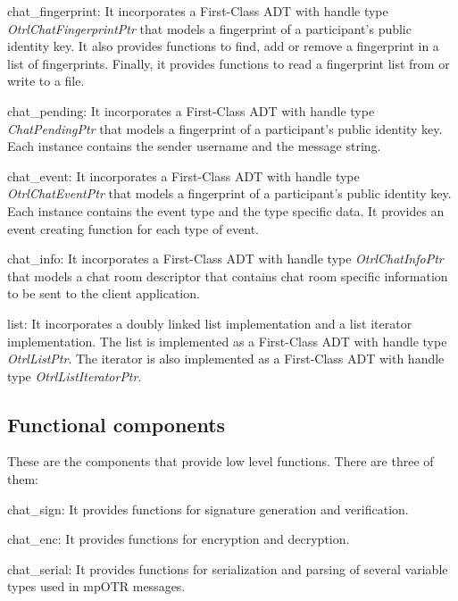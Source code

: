 \begin{description}
  \item chat\_fingerprint: It incorporates a First-Class ADT with handle type \emph{OtrlChatFingerprintPtr} that models a fingerprint of a participant's public identity key. It also provides functions to find, add or remove a fingerprint in a list of fingerprints. Finally, it provides functions to read a fingerprint list from or write to a file.

  \item chat\_pending: It incorporates a First-Class ADT with handle type \emph{ChatPendingPtr} that models a fingerprint of a participant's public identity key. Each instance contains the sender username and the message string.
  
  \item chat\_event: It incorporates a First-Class ADT with handle type \emph{OtrlChatEventPtr} that models a fingerprint of a participant's public identity key. Each instance contains the event type and the type specific data. It provides an event creating function for each type of event.

  \item chat\_info:  It incorporates a First-Class ADT with handle type \emph{OtrlChatInfoPtr} that models a chat room descriptor that contains chat room specific information to be sent to the client application.
  
  \item{list}: It incorporates a doubly linked list implementation and a list iterator implementation. The list is implemented as a First-Class ADT with handle type \emph{OtrlListPtr}. The iterator is also implemented as a First-Class ADT with handle type \emph{OtrlListIteratorPtr}.
\end{description}


\subsection{Functional components}
These are the components that provide low level functions. There are three of them:

\begin{description}
  \item chat\_sign: It provides functions for signature generation and verification.

  \item chat\_enc: It provides functions for encryption and decryption.

  \item chat\_serial: It provides functions for serialization and parsing of several variable types used in mpOTR messages. 
\end{description}


